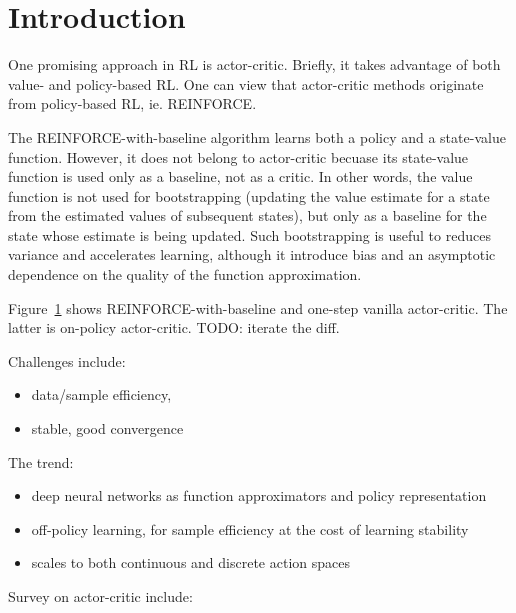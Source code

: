 \section{Introduction}

One promising approach in RL is actor-critic.
Briefly, it takes advantage of both value- and policy-based RL.
One can view that actor-critic methods originate from policy-based RL, ie. REINFORCE.

The REINFORCE-with-baseline algorithm learns both a policy and a state-value function.
However, it does not belong to actor-critic becuase
its state-value function is used only as a baseline, not as a critic.
In other words, the value function is not used for bootstrapping
(updating the value estimate for a state from the estimated values of subsequent states),
but only as a baseline for the state whose estimate is being updated.
Such bootstrapping is useful to reduces variance and accelerates learning,
although it introduce bias and an asymptotic dependence on
the quality of the function approximation.

Figure~\ref{} shows REINFORCE-with-baseline and one-step vanilla actor-critic.
The latter is on-policy actor-critic.
TODO: iterate the diff.

Challenges include:
\begin{itemize}
\item data/sample efficiency,
\item stable, good convergence
\end{itemize}

The trend:
\begin{itemize}
\item deep neural networks as
      function approximators and policy representation
\item off-policy learning,
      for sample efficiency at the cost of learning stability
\item scales to both continuous and discrete action spaces
\end{itemize}

Survey on actor-critic include:
\cite{6392457}
